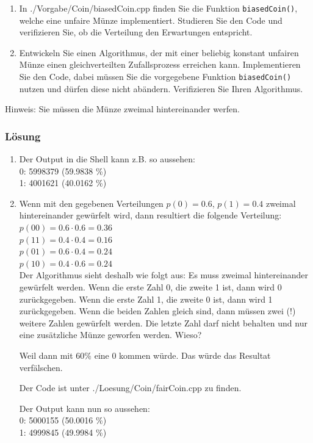 \begin{enumerate}
  \item In ./Vorgabe/Coin/biasedCoin.cpp finden Sie die Funktion \texttt{biasedCoin()}, welche eine unfaire Münze implementiert. Studieren Sie den Code und verifizieren Sie, ob die Verteilung den Erwartungen entspricht.
  \item Entwickeln Sie einen Algorithmus, der mit einer beliebig konstant unfairen Münze einen gleichverteilten Zufallsprozess erreichen kann. Implementieren Sie den Code, dabei müssen Sie die vorgegebene Funktion \texttt{biasedCoin()} nutzen und dürfen diese nicht abändern. Verifizieren Sie Ihren Algorithmus.
\end{enumerate}

Hinweis: Sie müssen die Münze zweimal hintereinander werfen.

\subsubsection{Lösung}

\begin{enumerate}
  \item Der Output in die Shell kann z.B. so aussehen: \\ 0: 5998379 (59.9838 \%) \\ 1: 4001621 (40.0162 \%)
  \item Wenn mit den gegebenen Verteilungen $p(0) = 0.6$, $p(1) = 0.4$ zweimal hintereinander gewürfelt wird, dann resultiert die folgende Verteilung:
  \\
  $p(00) = 0.6 \cdot 0.6 = 0.36$ \\
  $ p(11) = 0.4 \cdot 0.4 = 0.16$ \\
  $  p(01) = 0.6\cdot 0.4 = 0.24$ \\
   $p(10) = 0.4 \cdot 0.6 = 0.24$\\
Der Algorithmus sieht deshalb wie folgt aus: Es muss zweimal hintereinander gewürfelt werden. Wenn die erste Zahl 0, die zweite 1 ist, dann wird 0 zurückgegeben. Wenn die erste Zahl 1, die zweite 0 ist, dann wird 1 zurückgegeben. Wenn die beiden Zahlen gleich sind, dann müssen zwei (!) weitere Zahlen gewürfelt werden. Die letzte Zahl darf nicht behalten und nur eine zusätzliche Münze geworfen werden. Wieso?

Weil dann mit 60\% eine 0 kommen würde. Das würde das Resultat verfälschen.

Der Code ist unter ./Loesung/Coin/fairCoin.cpp zu finden.

Der Output kann nun so aussehen: \\ 0: 5000155 (50.0016 \%) \\ 1: 4999845 (49.9984 \%)
\end{enumerate}


